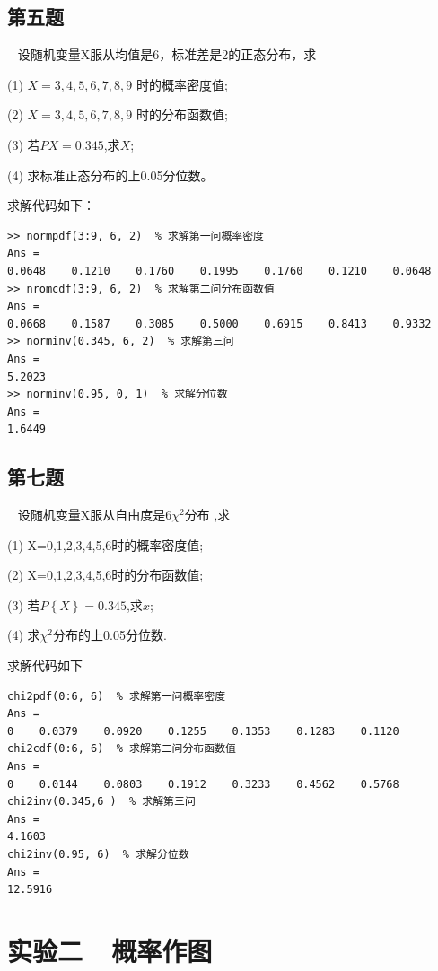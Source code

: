 \documentclass[12pt, a4paper]{ctexart}
\newcommand{\exercise}[1]{\noindent\tcbox[on line,top=0mm,bottom=0mm,%
	right=0mm,left=0mm]{\bfseries 练习#1}\ }
\begin{document}
\subsection{第五题}
\exercise{第五题}
设随机变量X服从均值是6，标准差是2的正态分布，求\par
(1) $X=3,4,5,6,7,8,9$ 时的概率密度值;\par
(2) $X =3,4,5,6,7,8,9 $ 时的分布函数值;\par
(3) 若$ P{X}=0.345 $,求$ X $;\par
(4) 求标准正态分布的上0.05分位数。\par

求解代码如下：

\begin{lstlisting}[style=Matlab-editor]
>> normpdf(3:9, 6, 2)  % 求解第一问概率密度
Ans = 
0.0648    0.1210    0.1760    0.1995    0.1760    0.1210    0.0648
>> nromcdf(3:9, 6, 2)  % 求解第二问分布函数值
Ans = 
0.0668    0.1587    0.3085    0.5000    0.6915    0.8413    0.9332
>> norminv(0.345, 6, 2)  % 求解第三问
Ans = 
5.2023
>> norminv(0.95, 0, 1)  % 求解分位数
Ans = 
1.6449
\end{lstlisting}


\subsection{第七题}
\exercise{第七题}
设随机变量X服从自由度是6$ \chi ^2 $分布 ,求\par
(1) X=0,1,2,3,4,5,6时的概率密度值; \par
(2) X=0,1,2,3,4,5,6时的分布函数值;\par
(3) 若$ P\left\{X\right\}=0.345 $,求$ x $;\par
(4) 求$ \chi^2 $分布的上0.05分位数.\par

求解代码如下

\begin{lstlisting}[style=Matlab-editor]
chi2pdf(0:6, 6)  % 求解第一问概率密度
Ans = 
0    0.0379    0.0920    0.1255    0.1353    0.1283    0.1120
chi2cdf(0:6, 6)  % 求解第二问分布函数值
Ans = 
0    0.0144    0.0803    0.1912    0.3233    0.4562    0.5768
chi2inv(0.345,6 )  % 求解第三问
Ans = 
4.1603
chi2inv(0.95, 6)  % 求解分位数
Ans = 
12.5916
\end{lstlisting}


\section{实验二~~概率作图}
\end{document}

